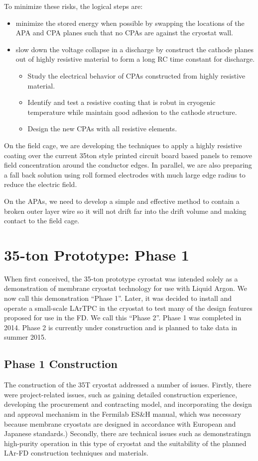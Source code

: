 To minimize these risks, the logical steps are:
\begin{itemize}
\item minimize the stored energy when possible by swapping the locations of the APA and CPA planes such that no CPAs are against the cryostat wall.
\item slow down the voltage collapse in a discharge by construct the cathode planes out of highly resistive material to form a long RC time constant for discharge.
\begin{itemize}
\item Study the electrical behavior of CPAs constructed from highly resistive material.
\item Identify and test a resistive coating that is robut in cryogenic temperature while maintain good adhesion to the cathode structure.
\item Design the new CPAs with all resistive elements.
\end{itemize}
\end{itemize}
 
On the field cage, we are developing the techniques to apply a highly resistive coating over the current 35ton style printed circuit board based panels to remove field concentration around the conductor edges. In parallel, we are also preparing a fall back solution using roll formed electrodes with much large edge radius to reduce the electric field.
 
On the APAs, we need to develop a simple and effective method to contain a broken outer layer wire so it will not drift far into the drift volume and making contact to the field cage.
 

\section{35-ton Prototype: Phase 1}
\label{35tonprototype}
When first conceived, the 35-ton prototype cyrostat was intended solely
as a demonstration of membrane cryostat technology for use with Liquid Argon. 
We now call this demonstration ``Phase 1''.
Later, it was decided to install and operate a small-scale LArTPC in the cryostat to test many of the design features
proposed for use in the FD. 
We call this ``Phase 2''.
Phase 1 was completed in 2014.
Phase 2 is currently under construction and is planned to take data in summer 2015.

\subsection{Phase 1 Construction}
The construction of the 35T cryostat addressed a number of issues.
Firstly, there were project-related issues, such as gaining detailed construction experience, 
developing the procurement and contracting model, and incorporating the design and approval mechanism 
in the Fermilab ES\&H manual, which was necessary because membrane cryostats are designed in accordance
with European and Japanese standards.)
Secondly, there are technical issues such as demonstratingn high-purity operation in this type of 
cryostat and the suitability of the planned LAr-FD construction techniques and materials.


